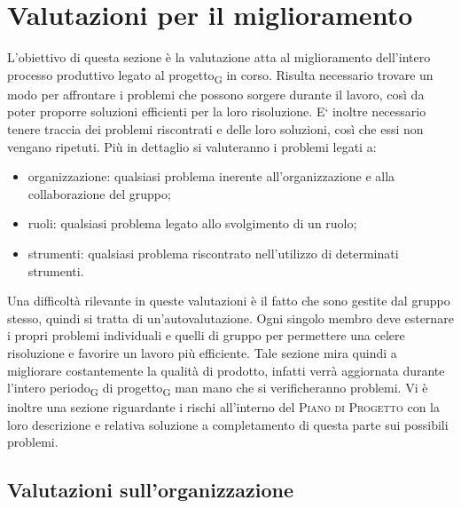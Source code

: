 \section{Valutazioni per il miglioramento}
L'obiettivo di questa sezione è la valutazione atta al miglioramento dell'intero processo produttivo legato al progetto\textsubscript{G} in corso. Risulta necessario trovare un modo per affrontare i problemi che possono sorgere durante il lavoro, così da poter proporre soluzioni efficienti per la loro risoluzione. E` inoltre necessario tenere traccia dei problemi riscontrati e delle loro soluzioni, così che essi non vengano ripetuti.
Più in dettaglio si valuteranno i problemi legati a:
\begin{itemize}
    \item organizzazione: qualsiasi problema inerente all'organizzazione e alla collaborazione del gruppo;
    \item ruoli: qualsiasi problema legato allo svolgimento di un ruolo;
    \item strumenti: qualsiasi problema riscontrato nell'utilizzo di determinati strumenti.
\end{itemize}

Una difficoltà rilevante in queste valutazioni è il fatto che sono gestite dal gruppo stesso, quindi si tratta di un'autovalutazione. Ogni singolo membro deve esternare i propri problemi individuali e quelli di gruppo per permettere una celere risoluzione e favorire un lavoro più efficiente.
Tale sezione mira quindi a migliorare costantemente la qualità di prodotto, infatti verrà aggiornata durante l'intero periodo\textsubscript{G} di progetto\textsubscript{G} man mano che si verificheranno problemi.
Vi è inoltre una sezione riguardante i  rischi all'interno del \textsc{Piano di Progetto} con la loro descrizione e relativa soluzione a completamento di questa parte sui possibili problemi.
\pagebreak
\subsection{Valutazioni sull'organizzazione}
